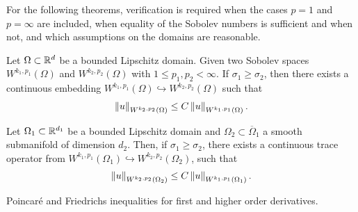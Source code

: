 \begin{todo}
  For the following theorems, verification is required when the cases $p=1$ and
  $p=\infty$ are included, when equality of the Sobolev numbers is
  sufficient and when not, and which assumptions on the domains are reasonable.
\end{todo}

\begin{theorem}
  Let $\Omega \subset \mathbb R^d$ be a bounded Lipschitz domain. Given two
  Sobolev spaces $W^{k_1, p_1}(\Omega)$ and $W^{k_2, p_2}(\Omega)$
  with $1 \le p_1, p_2 < \infty$. If $\sigma_1 \ge \sigma_2$, then
  there exists a continuous embedding $W^{k_1,
    p_1}(\Omega)\hookrightarrow W^{k_2, p_2}(\Omega)$ such that
\begin{gather*}
  \left\|u\right\|_{W^{k_2, p_2}(\Omega)} \le C \left\|u\right\|_{W^{k_1, p_1}(\Omega)}.
\end{gather*}
\end{theorem}

\begin{theorem}
  Let $\Omega_1 \subset \mathbb R^{d_1}$ be a bounded Lipschitz domain and
  $\Omega_2\subset \overline\Omega_1$ a smooth submanifold of
  dimension $d_2$. Then, if $\sigma_1 \ge \sigma_2$, there exists a
  continuous trace operator from $W^{k_1,
    p_1}(\Omega_1)\hookrightarrow W^{k_2, p_2}(\Omega_2)$, such that
  \begin{gather*}
    \left\|u\right\|_{W^{k_2, p_2}(\Omega_2)} \le C \left\|u\right\|_{W^{k_1, p_1}(\Omega_1)}.
  \end{gather*}
\end{theorem}

\begin{todo}
  Poincaré and Friedrichs inequalities for first and higher order
  derivatives.
\end{todo}


